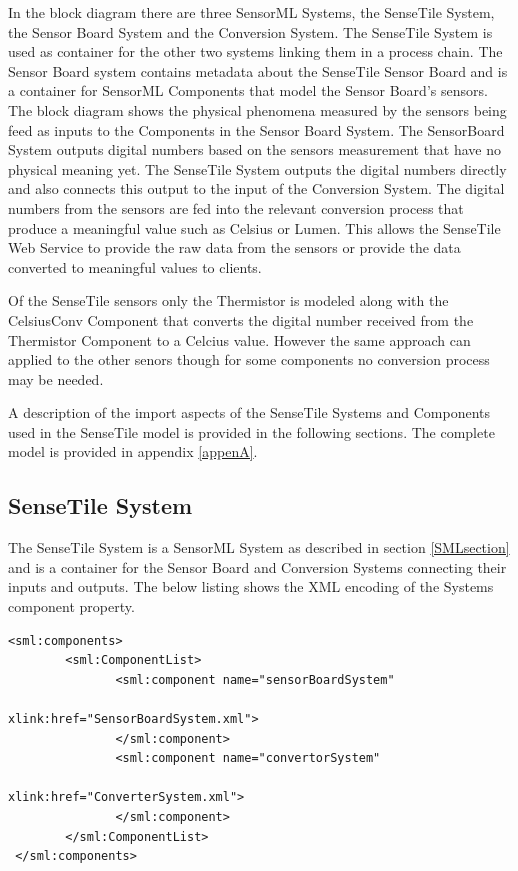 \documentclass[]{final_report}
\begin{document}
In the block diagram there are three SensorML Systems, the SenseTile System, the Sensor Board System and the Conversion System. The SenseTile System is used as container for the other two systems linking them in a process chain. The Sensor Board system contains metadata about the SenseTile Sensor Board and is a container for SensorML Components that model the Sensor Board's sensors.
\newpage
The block diagram shows the physical phenomena measured by the sensors being feed as inputs to the Components in the Sensor Board System. The SensorBoard System outputs digital numbers based on the sensors measurement that have no physical meaning yet. The SenseTile System outputs the digital numbers directly and also connects this output to the input of the Conversion System. The digital numbers from the sensors are fed into the relevant conversion process that produce a meaningful value such as Celsius or Lumen. This allows the SenseTile Web Service to provide the raw data from the sensors or provide the data converted to meaningful values to clients.

Of the SenseTile sensors only the Thermistor is modeled along with the  CelsiusConv Component that converts the digital number received from the Thermistor Component to a Celcius value. However the same approach can applied to the other senors though for some components no conversion process may be needed.

A description of the  import aspects of the SenseTile Systems and Components used in the SenseTile model is provided in the following sections. The complete model is provided in appendix \ref{appenA}.

\subsection{SenseTile System}
The SenseTile System is a SensorML System as described in section \ref{SMLsection} and is a container for the Sensor Board and Conversion Systems connecting their inputs and outputs. The below listing shows the XML encoding of the Systems component property.
\newline 
\lstset{language=XML,basicstyle=\scriptsize,frame=single}
\begin{lstlisting}[label=componentListing,caption=SenseTile System Components List]
<sml:components>
        <sml:ComponentList>
               <sml:component name="sensorBoardSystem" 
                                          xlink:href="SensorBoardSystem.xml">
               </sml:component>
               <sml:component name="convertorSystem"  
                                          xlink:href="ConverterSystem.xml">
               </sml:component>
        </sml:ComponentList>			   
 </sml:components>
\end{lstlisting}
\end{document}
